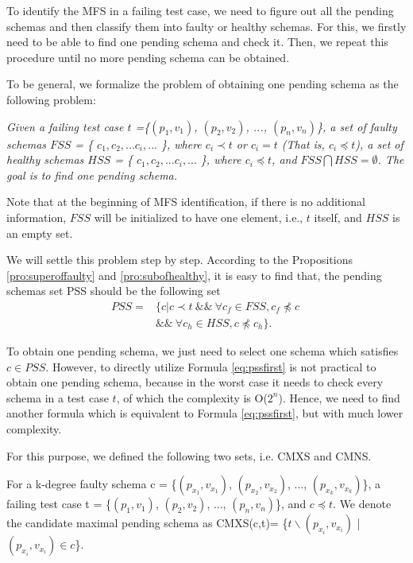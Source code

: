 \documentclass{sig-alternate-05-2015}
\begin{document}
To identify the MFS in a failing test case, we need to figure out all the pending schemas and then classify them into faulty or healthy schemas. For this, we firstly need to be able to find one pending schema and check it. Then, we repeat this procedure until no more pending schema can be obtained.

To be general, we formalize the problem of obtaining one pending schema as the following problem:

\emph{Given a failing test case $t$ =\{$(p_{1}, v_{1})$, $(p_{2}, v_{2})$, ..., $(p_{n}, v_{n})$\}, a set of faulty schemas $FSS$ = \{ $c_{1}, c_{2}, ... c_{i}, ...$ \}, where  $c_{i} \prec t$ or $c_{i} = t$ (That is, $c_{i} \preceq t $), a set of healthy schemas $HSS$ = \{ $c_{1}, c_{2}, ... c_{i}, ...$ \}, where  $c_{i} \preceq t$, and $FSS \bigcap HSS = \emptyset$. The goal is to find one pending schema.}

Note that at the beginning of MFS identification, if there is no additional information, $FSS$ will be initialized to have one element, i.e., $t$ itself, and $HSS$ is an empty set.

We will settle this problem step by step. According to the Propositions \ref{pro:superoffaulty} and \ref{pro:subofhealthy}, it is easy to find that, the pending schemas set PSS should be the following set \begin{equation}\begin{aligned}\label{eq:pssfirst}PSS=&\{ c | c \prec t\ \&\&\ \forall c_{f} \in FSS,  c_{f} \npreceq c\ \\ & \&\&\  \forall c_{h} \in HSS, c \npreceq c_{h} \} .\end{aligned} \end{equation}

To obtain one pending schema, we just need to select one schema which satisfies $ c \in PSS$. However, to directly utilize Formula \ref{eq:pssfirst} is not practical to obtain one pending schema, because in the worst case it needs to check every schema in a test case $t$, of which the complexity is O($2^{n}$). Hence, we need to find another formula which is equivalent to Formula \ref{eq:pssfirst}, but with much lower complexity.

For this purpose, we defined the following two sets, i.e. CMXS and CMNS.

\begin{definition}
For a k-degree faulty schema c = \{$(p_{x_{1}}, v_{x_{1}})$, $(p_{x_{2}}, v_{x_{2}})$, ..., $(p_{x_{k}}, v_{x_{k}})$\}, a failing test case t = \{$(p_{1}, v_{1})$, $(p_{2}, v_{2})$, ..., $(p_{n}, v_{n})$\}, and $c \preceq t$. We denote the candidate maximal pending schema as CMXS(c,t)= \{$t \backslash (p_{x_{i}}, v_{x_{i}})$ | $(p_{x_{i}}, v_{x_{i}}) \in c $\}.
\end{definition}
\end{document}
